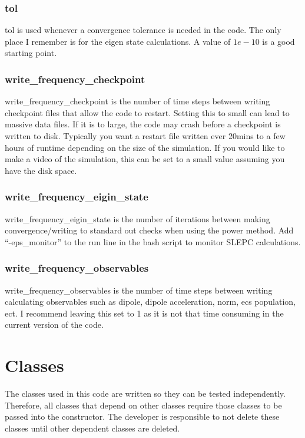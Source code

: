 \documentclass{article}
\begin{document}
\subsubsection{tol}
tol is used whenever a convergence tolerance is needed in the code. The only place I remember is for the eigen state calculations. A value of $1e-10$ is a good starting point.

\subsubsection{write\_frequency\_checkpoint}
write\_frequency\_checkpoint is the number of time steps between writing checkpoint files that allow the code to restart. Setting this to small can lead to massive data files. If it is to large, the code may crash before a checkpoint is written to disk. Typically you want a restart file written ever 20mins to a few hours of runtime depending on the size of the simulation. If you would like to make a video of the simulation, this can be set to a small value assuming you have the disk space.

\subsubsection{write\_frequency\_eigin\_state}
write\_frequency\_eigin\_state is the number of iterations between making convergence/writing to standard out checks when using the power method. Add ``-eps\_monitor'' to the run line in the bash script to monitor SLEPC calculations.

\subsubsection{write\_frequency\_observables}
write\_frequency\_observables is the number of time steps between writing calculating observables such as dipole, dipole acceleration, norm, ecs population, ect. I recommend leaving this set to 1 as it is not that time consuming in the current version of the code.




\section{Classes} %
\label{sec:classes}

The classes used in this code are written so they can be tested independently. Therefore, all classes that depend on other classes require those classes to be passed into the constructor. The developer is responsible to not delete these classes until other dependent classes are deleted.
\end{document}
